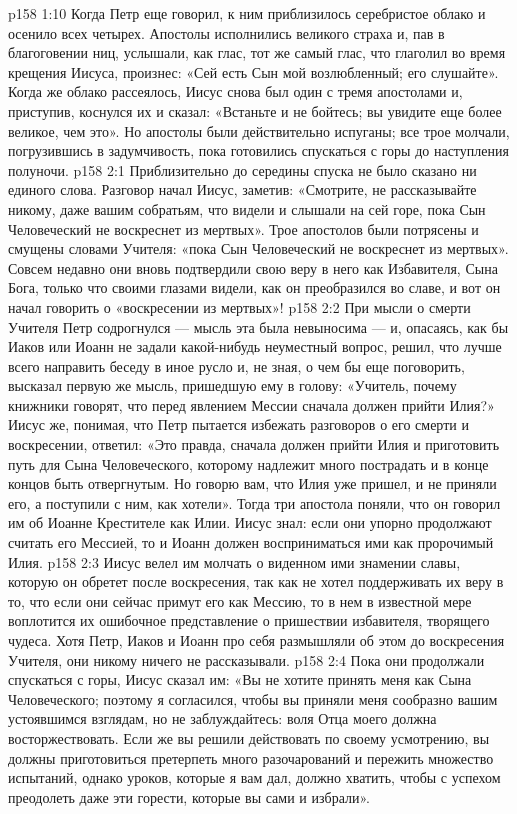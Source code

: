 \vs p158 1:10 Когда Петр еще говорил, к ним приблизилось серебристое облако и осенило всех четырех. Апостолы исполнились великого страха и, пав в благоговении ниц, услышали, как глас, тот же самый глас, что глаголил во время крещения Иисуса, произнес: «Сей есть Сын мой возлюбленный; его слушайте». Когда же облако рассеялось, Иисус снова был один с тремя апостолами и, приступив, коснулся их и сказал: «Встаньте и не бойтесь; вы увидите еще более великое, чем это». Но апостолы были действительно испуганы; все трое молчали, погрузившись в задумчивость, пока готовились спускаться с горы до наступления полуночи.
\vs p158 2:1 Приблизительно до середины спуска не было сказано ни единого слова. Разговор начал Иисус, заметив: «Смотрите, не рассказывайте никому, даже вашим собратьям, что видели и слышали на сей горе, пока Сын Человеческий не воскреснет из мертвых». Трое апостолов были потрясены и смущены словами Учителя: «пока Сын Человеческий не воскреснет из мертвых». Совсем недавно они вновь подтвердили свою веру в него как Избавителя, Сына Бога, только что своими глазами видели, как он преобразился во славе, и вот он начал говорить о «воскресении из мертвых»!
\vs p158 2:2 При мысли о смерти Учителя Петр содрогнулся --- мысль эта была невыносима --- и, опасаясь, как бы Иаков или Иоанн не задали какой\hyp{}нибудь неуместный вопрос, решил, что лучше всего направить беседу в иное русло и, не зная, о чем бы еще поговорить, высказал первую же мысль, пришедшую ему в голову: «Учитель, почему книжники говорят, что перед явлением Мессии сначала должен прийти Илия?» Иисус же, понимая, что Петр пытается избежать разговоров о его смерти и воскресении, ответил: «Это правда, сначала должен прийти Илия и приготовить путь для Сына Человеческого, которому надлежит много пострадать и в конце концов быть отвергнутым. Но говорю вам, что Илия уже пришел, и не приняли его, а поступили с ним, как хотели». Тогда три апостола поняли, что он говорил им об Иоанне Крестителе как Илии. Иисус знал: если они упорно продолжают считать его Мессией, то и Иоанн должен восприниматься ими как пророчимый Илия.
\vs p158 2:3 Иисус велел им молчать о виденном ими знамении славы, которую он обретет после воскресения, так как не хотел поддерживать их веру в то, что если они сейчас примут его как Мессию, то в нем в известной мере воплотится их ошибочное представление о пришествии избавителя, творящего чудеса. Хотя Петр, Иаков и Иоанн про себя размышляли об этом до воскресения Учителя, они никому ничего не рассказывали.
\vs p158 2:4 Пока они продолжали спускаться с горы, Иисус сказал им: «Вы не хотите принять меня как Сына Человеческого; поэтому я согласился, чтобы вы приняли меня сообразно вашим устоявшимся взглядам, но не заблуждайтесь: воля Отца моего должна восторжествовать. Если же вы решили действовать по своему усмотрению, вы должны приготовиться претерпеть много разочарований и пережить множество испытаний, однако уроков, которые я вам дал, должно хватить, чтобы с успехом преодолеть даже эти горести, которые вы сами и избрали».

